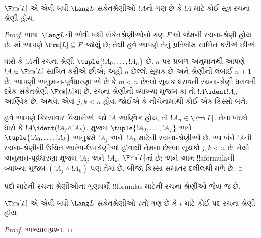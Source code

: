 \documentclass[../../../include/open-logic-section]{subfiles}
\begin{document}
\begin{thm}
$\Frm[L]$ એ એવી બધી $\Lang L$-સંકેતશ્રેણીઓ~$!A$નો ગણ છે કે
$!A$ માટે કોઈ સૂત્ર-રચના-શ્રેણી હોય.
\end{thm}

\begin{proof}
ભાષા~$\Lang L$ની એવી બધી સંકેતશ્રેણીઓનો ગણ $F$ લો જેમની
રચના-શ્રેણી હોય છે. માં આપણે
$\Frm[L] \subseteq F$ જોયું છે; તેથી હવે આપણે તેનું પ્રતિલોમ
સાબિત કરીએ છીએ.

ધારો કે $!A$ની રચના-શ્રેણી $\tuple{!A_0,\dotsc,!A_n}$ છે. $n$ પર
પ્રબળ અનુમાનથી આપણે $!A \in \Frm[L]$ સાબિત કરીએ છીએ; અહીં $n$ છેલ્લો
સૂચક છે અને શ્રેણીની લંબાઈ $n+1$ છે. આપણી અનુમાન-પૂર્વધારણા એ છે કે
$m < n$ છેલ્લો સૂચક ધરાવતી રચના-શ્રેણી ધરાવતી દરેક
સંકેતશ્રેણી $\Frm[L]$માં છે. રચના-શ્રેણીની વ્યાખ્યા મુજબ કાં તો
$!A \ident !A_n$ આણ્વિક છે, અથવા એવાં $j,k < n$ હોવા જોઈએ કે
નીચેનામાંથી કોઈ એક કિસ્સો બને:
\begin{enumerate}
\end{enumerate}
હવે આપણે કિસ્સાવાર વિચારીએ. જો $!A$ આણ્વિક હોય, તો
$!A_n \in \Frm[L]$. તેના બદલે ધારો કે
$!A \ident (!A_j \land !A_k)$. 
મુજબ $\tuple{!A_0,\dotsc,!A_j}$ અને $\tuple{!A_0,\dotsc,!A_k}$ અનુક્રમે
$!A_j$ અને~$!A_k$ માટેની રચના-શ્રેણીઓ છે. આ બંને $!A$ની
રચના-શ્રેણીની ઉચિત આરંભ-ઉપશ્રેણીઓ હોવાથી તેમના છેલ્લા સૂચકો $j,k<n$ છે.
તેથી અનુમાન-પૂર્વધારણા મુજબ $!A_j$ અને~$!A_k$, $\Frm[L]$માં છે;
અને આમ !!a{formula}ની વ્યાખ્યા મુજબ $(!A_j \land !A_k)$ પણ તેમાં છે.
બીજા કિસ્સા સમાંતર દલીલથી મળે છે.
\end{proof}


પદો માટેની રચના-શ્રેણીઓના ગુણધર્મો !!{formula}s માટેની
રચના-શ્રેણીઓ જેવા જ છે.

\begin{prop}
$\Trm[L]$ એ એવી બધી $\Lang L$-સંકેતશ્રેણીઓ~$t$નો ગણ છે કે
$t$ માટે કોઈ પદ-રચના-શ્રેણી હોય.
\end{prop}

\begin{proof}
અભ્યાસપ્રશ્ન.
\end{proof}
\end{document}
